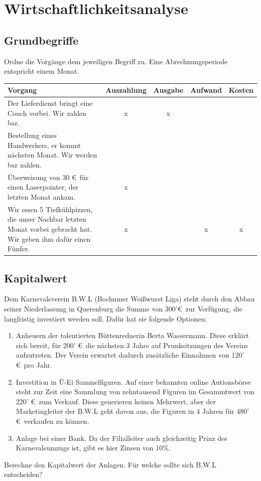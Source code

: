 \documentclass[11pt, a4paper]{article}
\begin{document}
\newpage
\section{Wirtschaftlichkeitsanalyse}
\subsection{Grundbegriffe}
Ordne die Vorgänge dem jeweiligen Begriff zu. Eine Abrechnungsperiode entspricht einem Monat.

\begin{tabularx}{\columnwidth}{X|c|c|c|c}
	Vorgang & Auszahlung & Ausgabe & Aufwand & Kosten \\ \hline
	Der Lieferdienst bringt eine Couch vorbei. Wir zahlen bar. & x & x &  &  \\ \hline
	Bestellung eines Handwerkers, er kommt nächsten Monat. Wir werden bar zahlen. &  &  &  &  \\ \hline
	Überweisung von 30 \euro \ für einen Laserpointer, der letzten Monat ankam. & x &  &  & \\ \hline
	Wir essen 5 Tiefkühlpizzen, die unser Nachbar letzten Monat vorbei gebracht hat. Wir geben ihm dafür einen Fünfer. & x &  & x & x
\end{tabularx}

\subsection{Kapitalwert}
Dem Karnevalsverein B.W.L (Bochumer Weißwurst Liga) steht durch den Abbau seiner Niederlassung in Querenburg die Summe von 300'\euro \ zur Verfügung, die langfristig investiert werden soll. Dafür hat sie folgende Optionen:
\begin{enumerate}
	\item Anheuern der talentierten Büttenrednerin Berta Wassermann. Diese erklärt sich bereit, für 200' \euro \ die nächsten 3 Jahre auf Prunksitzungen des Vereins aufzutreten. Der Verein erwartet dadurch zusätzliche Einnahmen von 120' \euro \ pro Jahr.
	\item Investition in Ü-Ei Sammelfiguren. Auf einer bekannten online Autionsbörse steht zur Zeit eine Sammlung von zehntausend Figuren im Gesammtwert von 220' \euro \ zum Verkauf. Diese generieren keinen Mehrwert, aber der Marketingleiter der B.W.L geht davon aus, die Figuren in 4 Jahren für 480' \euro \ verkaufen zu können.
	\item Anlage bei einer Bank. Da der Filialleiter auch gleichzeitig Prinz des Karnevalsumzugs ist, gibt es hier Zinsen von 10\%.
\end{enumerate}
Berechne den Kapitalwert der Anlagen. Für welche sollte sich B.W.L entscheiden?
\end{document}
